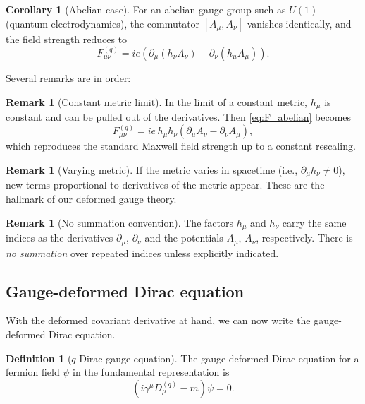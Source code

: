 \documentclass[12pt,a4paper]{article}
\theoremstyle{plain}
\theoremstyle{definition}
\newtheorem{definition}[theorem]{Definition}
\newtheorem{remark}[theorem]{Remark}
\newtheorem{corollary}[theorem]{Corollary}
\begin{document}
\begin{corollary}[Abelian case]
For an abelian gauge group such as \(U(1)\) (quantum electrodynamics), the commutator \([A_\mu, A_\nu]\) vanishes identically, and the field strength reduces to
\begin{equation}
F_{\mu\nu}^{(q)} = ie\left( \partial_\mu(h_\nu A_\nu) - \partial_\nu(h_\mu A_\mu) \right). \label{eq:F_abelian}
\end{equation}
\end{corollary}

Several remarks are in order:

\begin{remark}[Constant metric limit]
In the limit of a constant metric, \(h_\mu\) is constant and can be pulled out of the derivatives. Then \eqref{eq:F_abelian} becomes
\[
F_{\mu\nu}^{(q)} = ie\, h_\mu h_\nu (\partial_\mu A_\nu - \partial_\nu A_\mu),
\]
which reproduces the standard Maxwell field strength up to a constant rescaling.
\end{remark}

\begin{remark}[Varying metric]
If the metric varies in spacetime (i.e., $\partial_\mu h_\nu \neq 0$), new terms proportional to derivatives of the metric appear. These are the hallmark of our deformed gauge theory.
\end{remark}

\begin{remark}[No summation convention]
The factors \(h_\mu\) and \(h_\nu\) carry the same indices as the derivatives \(\partial_\mu\), \(\partial_\nu\) and the potentials \(A_\mu\), \(A_\nu\), respectively. There is \emph{no summation} over repeated indices unless explicitly indicated.
\end{remark}

\subsection{Gauge-deformed Dirac equation}

With the deformed covariant derivative at hand, we can now write the gauge-deformed Dirac equation.

\begin{definition}[$q$-Dirac gauge equation]
The gauge-deformed Dirac equation for a fermion field \(\psi\) in the fundamental representation is
\begin{equation}\label{eq:q_dirac_gauge}
\left( i \gamma^\mu D_\mu^{(q)} - m \right) \psi = 0.
\end{equation}
\end{definition}
\end{document}
